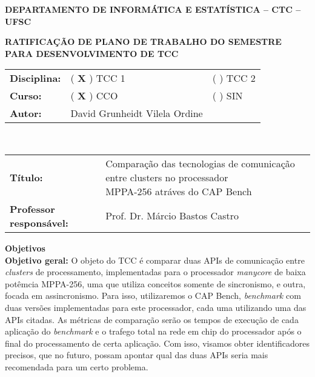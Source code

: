\documentclass[12pt]{article}
\begin{document}
\pagestyle{empty}

\begin{centering}

    \textbf{DEPARTAMENTO DE INFORMÁTICA E ESTATÍSTICA -- CTC -- UFSC}

    \textbf{RATIFICAÇÃO DE PLANO DE TRABALHO DO SEMESTRE \\ PARA DESENVOLVIMENTO DE TCC}

\end{centering}


\vspace{1em}
\setlength\extrarowheight{5pt}
\begin{tabular}{l l l}
    \textbf{Disciplina:} & ( \textbf{X} ) TCC 1  &  ( ) TCC 2\\
    \textbf{Curso:}      & ( \textbf{X} ) CCO & ( ) SIN \\
    \textbf{Autor:}      & David Grunheidt Vilela Ordine &\\
\end{tabular}
\vspace{0.5cm}
\\
\begin{tabular}{l l}
\vspace{0.5cm}
     \textbf{Título:} & \makecell{Comparação das tecnologias de comunicação entre clusters no processador \\ MPPA-256 atráves do CAP Bench}\\
    \textbf{Professor responsável:} & Prof. Dr. Márcio Bastos Castro\\
\end{tabular}


\vspace{1em}
{\large \textbf{Objetivos}}
\\

\textbf{Objetivo geral:}
O objeto do TCC é comparar duas APIs de comunicação entre \textit{clusters} de processamento, implementadas para o processador \textit{manycore} de baixa potêmcia MPPA-256, uma que utiliza conceitos somente de sincronismo, e outra, focada em assincronismo. Para isso, utilizaremos o CAP Bench, \textit{benchmark} com duas versões implementadas para este processador, cada uma utilizando uma das APIs citadas. As métricas de comparação serão os tempos de execução de cada aplicação do \textit{benchmark} e o trafego total na rede em chip do processador após o final do processamento de certa aplicação. Com isso, visamos obter identificadores precisos, que no futuro, possam apontar qual das duas APIs seria mais recomendada para um certo problema.
\end{document}
